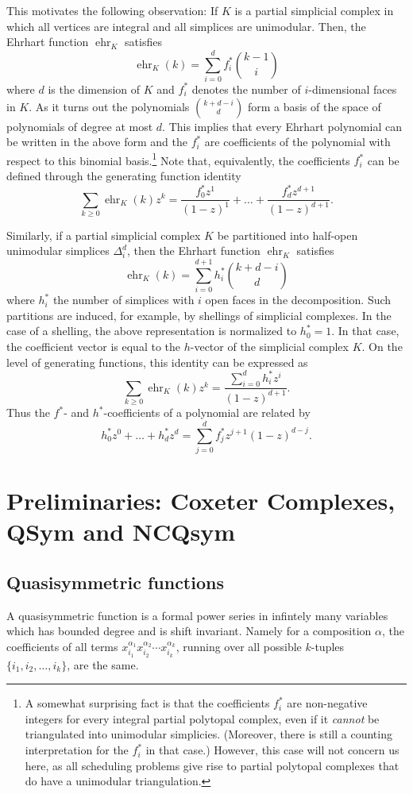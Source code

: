 \documentclass[12pt]{amsart}
\newcommand{\ehr}{\operatorname{ehr}}
\begin{document}
This motivates the following observation: If $K$ is a partial simplicial complex in which all vertices are integral and all simplices are unimodular. Then, the Ehrhart function $\ehr_K$ satisfies
\[
  \ehr_K(k) = \sum_{i=0}^d f_i^* \binom{k-1}{i}
\]
where $d$ is the dimension of $K$ and $f_i^*$ denotes the number of $i$-dimensional faces in $K$. As it turns out the polynomials $\binom{k+d-i}{d}$ form a basis of the space of polynomials of degree at most $d$. This implies that every Ehrhart polynomial can be written in the above form and the $f_i^*$ are coefficients of the polynomial with respect to this binomial basis.\footnote{A somewhat surprising fact is that the coefficients $f_i^*$ are non-negative integers for every integral partial polytopal complex, even if it \emph{cannot} be triangulated into unimodular simplicies. (Moreover, there is still a counting interpretation for the $f_i^*$ in that case.) However, this case will not concern us here, as all scheduling problems give rise to partial polytopal complexes that do have a unimodular triangulation.} Note that, equivalently, the coefficients $f_i^*$ can be defined through the generating function identity
\[
\sum_{k \geq 0}\ehr_K(k) z^k = \frac{f^*_0 z^1}{(1-z)^1} + \ldots + \frac{f^*_d z^{d+1}}{(1-z)^{d+1}}.
\]

Similarly, if a partial simplicial complex $K$ be partitioned into half-open unimodular simplices $\Delta^d_i$, then the Ehrhart function $\ehr_K$ satisfies
\[
  \ehr_K(k) = \sum_{i=0}^{d+1} h_i^* \binom{k+d-i}{d}
\]
where $h_i^*$ the number of simplices with $i$ open faces in the decomposition. Such partitions are induced, for example, by shellings of simplicial complexes. In the case of a shelling, the above representation is normalized to $h_0^* = 1$. In that case, the coefficient vector is equal to the $h$-vector of the simplicial complex $K$. On the level of generating functions, this identity can be expressed as
\[
  \sum_{k \geq 0} \ehr_K(k) z^k = \frac{\sum_{i=0}^d h_i^* z^i}{(1-z)^{d+1}}.
\]
Thus the $f^*$- and $h^*$-coefficients of a polynomial are related by
\[
  h^*_0z^0 + \ldots + h^*_d z^d = \sum_{j=0}^d f^*_j z^{j+1} (1-z)^{d-j}.
\]

\section{Preliminaries: Coxeter Complexes, QSym and NCQsym}
\label{sec:prelim-qsym}

\subsection{Quasisymmetric functions}
A quasisymmetric function is a formal power series in infintely many
variables which has bounded degree and is shift invariant.  Namely for
a composition $\alpha$, the coefficients of all terms
$x_{i_1}^{\alpha_1}x_{i_2}^{\alpha_2} \cdots x_{i_k}^{\alpha_k}$,
running over all possible $k$-tuples $\{i_1, i_2, \ldots, i_k \}$, are
the same.
\end{document}
